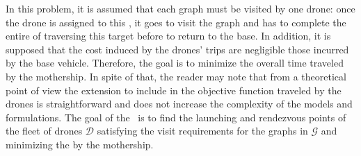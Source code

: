 \noindent
In this problem, it is assumed that each graph must be visited by one drone: once the drone is assigned to this , it goes to visit the graph and has to complete the entire  of traversing this target before to return to the base. %
  In addition, it is supposed that the cost induced by the drones' trips are negligible  those incurred by the base vehicle. Therefore, the goal is to minimize the overall time traveled by the mothership. In spite of that, the reader may note that from a theoretical point of view\RE{,} the extension to include in the objective function  traveled by the drones is straightforward and does not increase the complexity of the models and formulations.
\noindent
The goal of the \AMD \ is to find the launching and rendezvous points of the fleet of drones $\mathcal D$ satisfying the visit requirements for the graphs in $\mathcal G$ and minimizing the  by the mothership.\\

\noindent
